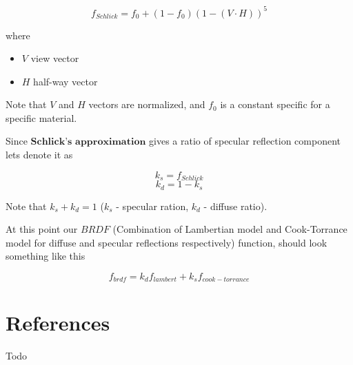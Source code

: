\documentclass{article}
\begin{document}
\[
    f_{Schlick} = f_{0} + (1 - f_{0})(1 - (V \cdot H))^5
\]

where
\begin{itemize}
    \item $V$ view vector
    \item $H$ half-way vector
\end{itemize}

Note that $V$ and $H$ vectors are normalized, and $f_{0}$ is a constant specific for a specific material.

Since $\textbf{Schlick's approximation}$ gives a ratio of specular reflection component lets denote it as

\[
    k_s = f_{Schlick}
\]
\[
    k_d = 1 - k_s
\]

Note that $k_s + k_d = 1$ ($k_s$ - specular ration, $k_d$ - diffuse ratio).

At this point our $BRDF$ (Combination of Lambertian model and Cook-Torrance model for diffuse and specular reflections respectively) function, 
should look something like this

\[
    f_{brdf} = k_d f_{lambert} + k_s f_{cook-torrance}
\]

\section{References}
Todo
\end{document}

